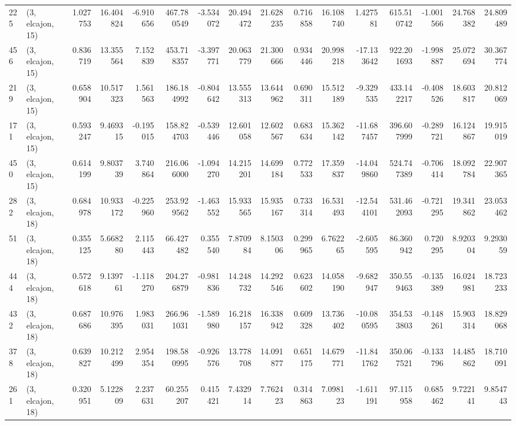 \begin{tabular}{llrrrrrrrrrrrrrr}
225 &  (3, elcajon, 15) &   1.027753 &  16.404824 &  -6.910656 &   467.780549 &  -3.534072 &  20.494472 &  21.628235 &  0.716858 &  16.108740 &   1.427581 &    615.510742 &   -1.001566 &   24.768382 &   24.809489 \\
456 &  (3, elcajon, 15) &   0.836719 &  13.355564 &   7.152839 &   453.718357 &  -3.397771 &  20.063779 &  21.300666 &  0.934446 &  20.998218 & -17.133642 &    922.201693 &   -1.998887 &   25.072694 &   30.367774 \\
219 &  (3, elcajon, 15) &   0.658904 &  10.517323 &   1.561563 &   186.184992 &  -0.804642 &  13.555313 &  13.644962 &  0.690311 &  15.512189 &  -9.329535 &    433.142217 &   -0.408526 &   18.603817 &   20.812069 \\
171 &  (3, elcajon, 15) &   0.593247 &   9.469315 &  -0.195015 &   158.824703 &  -0.539446 &  12.601058 &  12.602567 &  0.683634 &  15.362142 & -11.687457 &    396.607999 &   -0.289721 &   16.124867 &   19.915019 \\
450 &  (3, elcajon, 15) &   0.614199 &   9.803739 &   3.740864 &   216.066000 &  -1.094270 &  14.215201 &  14.699184 &  0.772533 &  17.359837 & -14.049860 &    524.747389 &   -0.706414 &   18.092784 &   22.907365 \\
282 &  (3, elcajon, 18) &   0.684978 &  10.933172 &  -0.225960 &   253.929562 &  -1.463552 &  15.933565 &  15.935167 &  0.733314 &  16.531493 & -12.544101 &    531.462093 &   -0.721295 &   19.341862 &   23.053462 \\
51  &  (3, elcajon, 18) &   0.355125 &   5.668280 &   2.115443 &    66.427482 &   0.355540 &   7.870984 &   8.150306 &  0.299965 &   6.762265 &  -2.605595 &     86.360942 &    0.720295 &    8.920304 &    9.293059 \\
444 &  (3, elcajon, 18) &   0.572618 &   9.139761 &  -1.118270 &   204.276879 &  -0.981836 &  14.248732 &  14.292546 &  0.623602 &  14.058190 &  -9.682947 &    350.559463 &   -0.135389 &   16.024981 &   18.723233 \\
432 &  (3, elcajon, 18) &   0.687686 &  10.976395 &   1.983031 &   266.961031 &  -1.589980 &  16.218157 &  16.338942 &  0.609328 &  13.736402 & -10.080595 &    354.533803 &   -0.148261 &   15.903314 &   18.829068 \\
378 &  (3, elcajon, 18) &   0.639827 &  10.212499 &   2.954354 &   198.580995 &  -0.926576 &  13.778708 &  14.091877 &  0.651175 &  14.679771 & -11.841762 &    350.067521 &   -0.133796 &   14.485862 &   18.710091 \\
261 &  (3, elcajon, 18) &   0.320951 &   5.122809 &   2.237631 &    60.255207 &   0.415421 &   7.432914 &   7.762423 &  0.314863 &   7.098123 &  -1.611191 &     97.115958 &    0.685462 &    9.722141 &    9.854743 \\

\end{tabular}
